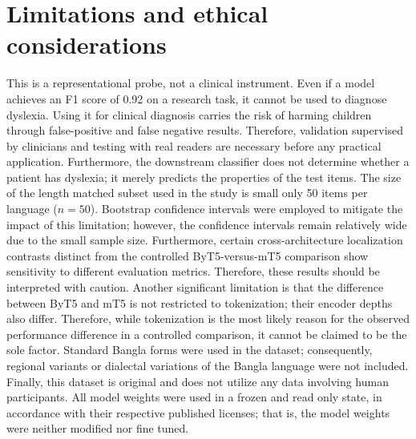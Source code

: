 \documentclass[preprint,12pt]{elsarticle}
\begin{document}
\section{Limitations and ethical considerations}
\label{sec:limits}
This is a representational probe, not a clinical instrument. Even if a model achieves an F1 score of 0.92 on a research task, it cannot be used to diagnose dyslexia. Using it for clinical diagnosis carries the risk of harming children through false-positive and false negative results. Therefore, validation supervised by clinicians and testing with real readers are necessary before any practical application. Furthermore, the downstream classifier does not determine whether a patient has dyslexia; it merely predicts the properties of the test items. The size of the length matched subset used in the study is small only 50 items per language ($n = 50$). Bootstrap confidence intervals were employed to mitigate the impact of this limitation; however, the confidence intervals remain relatively wide due to the small sample size. Furthermore, certain cross-architecture localization contrasts distinct from the controlled ByT5-versus-mT5 comparison show sensitivity to different evaluation metrics. Therefore, these results should be interpreted with caution. Another significant limitation is that the difference between ByT5 and mT5 is not restricted to tokenization; their encoder depths also differ. Therefore, while tokenization is the most likely reason for the observed performance difference in a controlled comparison, it cannot be claimed to be the sole factor. Standard Bangla forms were used in the dataset; consequently, regional variants or dialectal variations of the Bangla language were not included. Finally, this dataset is original and does not utilize any data involving human participants. All model weights were used in a frozen and read only state, in accordance with their respective published licenses; that is, the model weights were neither modified nor fine tuned.

\end{document}
